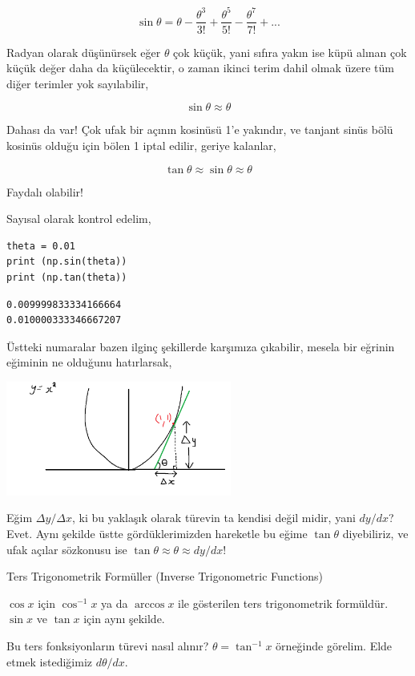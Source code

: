 \documentclass[12pt,fleqn]{article}\usepackage{../../common}
\begin{document}
$$
\sin\theta =
\theta -
\frac{\theta^3}{3!} +
\frac{\theta^5}{5!} -
\frac{\theta^7}{7!} + ...
$$

Radyan olarak düşünürsek eğer $\theta$ çok küçük, yani sıfıra yakın ise küpü
alınan çok küçük değer daha da küçülecektir, o zaman ikinci terim dahil olmak
üzere tüm diğer terimler yok sayılabilir,

$$
\sin\theta \approx \theta
$$

Dahası da var! Çok ufak bir açının kosinüsü 1'e yakındır, ve tanjant sinüs bölü
kosinüs olduğu için bölen 1 iptal edilir, geriye kalanlar,

$$
\tan\theta \approx \sin\theta \approx \theta
$$

Faydalı olabilir!

Sayısal olarak kontrol edelim,

\begin{verbatim}
theta = 0.01
print (np.sin(theta))
print (np.tan(theta))
\end{verbatim}

\begin{verbatim}
0.009999833334166664
0.010000333346667207
\end{verbatim}

Üstteki numaralar bazen ilginç şekillerde karşımıza çıkabilir, mesela bir
eğrinin eğiminin ne olduğunu hatırlarsak,

\includegraphics[width=20em]{slope_tan2.png}

Eğim $\Delta y / \Delta x$, ki bu yaklaşık olarak türevin ta kendisi değil
midir, yani $dy / dx$? Evet. Aynı şekilde üstte gördüklerimizden hareketle
bu eğime $\tan\theta$ diyebiliriz, ve ufak açılar sözkonusu ise
$\tan\theta \approx \theta \approx dy / dx$!

Ters Trigonometrik Formüller (Inverse Trigonometric Functions)

$\cos x$ için $\cos^{-1} x$ ya da $\arccos x$ ile gösterilen ters
trigonometrik formüldür. $\sin x$ ve $\tan x$ için aynı şekilde. 

Bu ters fonksiyonların türevi nasıl alınır? $\theta = \tan^{-1}x$ örneğinde
görelim. Elde etmek istediğimiz $d\theta/dx$. 
\end{document}
